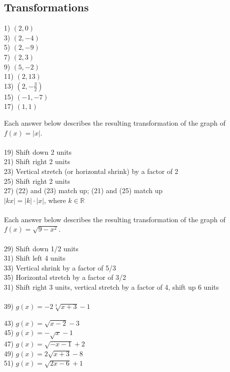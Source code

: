 \documentclass[11pt]{book}
\theoremstyle{definition}  %
\begin{document}
\newpage
\subsection*{Transformations}


\begin{multicols}{2}
1) $(2,0)$\\
3) $(2,-4)$\\
5) $(2,-9)$\\
7) $(2,3)$\\
9) $(5,-2)$\\
11) $(2,13)$\\
13) $(2,-\frac{3}{2})$\\
15) $(-1,-7)$\\
17) $(1,1)$\\
\end{multicols}

Each answer below describes the resulting transformation of the graph of $f(x)=|x|$.\\
~\\
19) Shift down 2 units\\
21) Shift right 2 units\\
23) Vertical stretch (or horizontal shrink) by a factor of 2\\
25) Shift right 2 units\\
27) (22) and (23) match up; (21) and (25) match up\\
$|kx|=|k|\cdot|x|$, where $k\in\mathbb{R}$\\
~\\
Each answer below describes the resulting transformation of the graph of $f(x)=\sqrt{9-x^2}$.\\
~\\
29) Shift down 1/2 units\\
31) Shift left 4 units\\
33) Vertical shrink by a factor of 5/3\\
35) Horizontal stretch by a factor of 3/2\\
31) Shift right 3 units, vertical stretch by a factor of 4, shift up 6 units\\
~\\
39) $g(x)=-2\sqrt[3]{x+3}-1$
\begin{multicols}{2}
43) $g(x)=\sqrt{x-2}-3$\\
45) $g(x)=-\sqrt{x}-1$\\
47) $g(x)=\sqrt{-x-1}+2$\\
49) $g(x)=2\sqrt{x+3}-8$\\
51) $g(x)=\sqrt{2x-6}+1$
\end{multicols}
\end{document}
